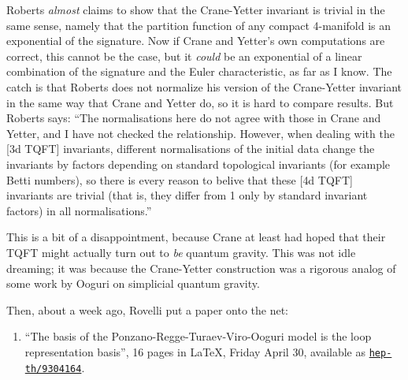 \documentclass{article}
\def\tightlist{}
\begin{document}
Roberts \emph{almost} claims to show that the Crane-Yetter invariant is
trivial in the same sense, namely that the partition function of any
compact 4-manifold is an exponential of the signature. Now if Crane and
Yetter's own computations are correct, this cannot be the case, but it
\emph{could} be an exponential of a linear combination of the signature
and the Euler characteristic, as far as I know. The catch is that
Roberts does not normalize his version of the Crane-Yetter invariant in
the same way that Crane and Yetter do, so it is hard to compare results.
But Roberts says: ``The normalisations here do not agree with those in
Crane and Yetter, and I have not checked the relationship. However, when
dealing with the {[}3d TQFT{]} invariants, different normalisations of
the initial data change the invariants by factors depending on standard
topological invariants (for example Betti numbers), so there is every
reason to belive that these {[}4d TQFT{]} invariants are trivial (that
is, they differ from 1 only by standard invariant factors) in all
normalisations.''

This is a bit of a disappointment, because Crane at least had hoped that
their TQFT might actually turn out to \emph{be} quantum gravity. This
was not idle dreaming; it was because the Crane-Yetter construction was
a rigorous analog of some work by Ooguri on simplicial quantum gravity.

Then, about a week ago, Rovelli put a paper onto the net:

\begin{enumerate}
\def\labelenumi{\arabic{enumi})}
\setcounter{enumi}{1}
\tightlist
\item
  ``The basis of the Ponzano-Regge-Turaev-Viro-Ooguri model is the loop
  representation basis'', 16 pages in LaTeX, Friday April 30, available
  as
  \href{http://xxx.lanl.gov/abs/hep-th/9304164}{\texttt{hep-th/9304164}}.
\end{enumerate}
\end{document}
